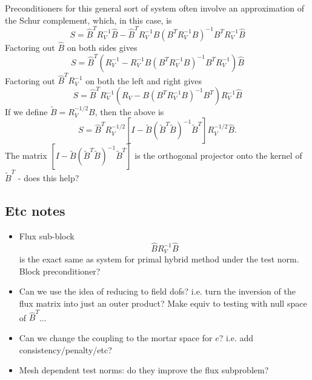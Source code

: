 \documentclass{article}
\newcommand{\LRp}[1]{\left( #1 \right)}
\newcommand{\LRs}[1]{\left[ #1 \right]}
\begin{document}
Preconditioners for this general sort of system often involve an approximation of the Schur complement, which, in this case, is
\[
S = \hat{B}^TR_V^{-1}\hat{B} - \hat{B}^TR_V^{-1}{B}\LRp{B^TR_V^{-1}B}^{-1} B^TR_V^{-1}\hat{B}
\]
Factoring out $\hat{B}$ on both sides gives
\[
S = \hat{B}^T\LRp{R_V^{-1} - R_V^{-1}{B}\LRp{B^TR_V^{-1}B}^{-1} B^TR_V^{-1}}\hat{B}
\]
Factoring out $\hat{B}^TR_V^{-1}$ on both the left and right gives
\[
S = \hat{B}^TR_V^{-1}\LRp{R_V-B\LRp{B^TR_V^{-1}B}^{-1}B^T}R_V^{-1}\hat{B}
\]
If we define $\tilde{B} = R_V^{-1/2}{B}$, then the above is
\[
S = \hat{B}^TR_V^{-1/2}\LRs{I - \tilde{B}(\tilde{B}^T\tilde{B})^{-1}\tilde{B}^T}R_V^{-1/2}\hat{B}.
\]
The matrix $\LRs{I - \tilde{B}(\tilde{B}^T\tilde{B})^{-1}\tilde{B}^T}$ is the orthogonal projector onto the kernel of $\tilde{B}^T$ - does this help? 

\subsection{Etc notes}
\begin{itemize}
\item Flux sub-block
\[
\hat{B}R_V^{-1}\hat{B}
\]
is the exact same as system for primal hybrid method under the test norm.  Block preconditioner?
\item Can we use the idea of reducing to field dofs?  i.e. turn the inversion of the flux matrix into just an outer product?  Make equiv to testing with null space of $\hat{B}^T$...
\item Can we change the coupling to the mortar space for $e$?  i.e. add consistency/penalty/etc?
\item Mesh dependent test norms: do they improve the flux subproblem?  
\end{itemize}
\end{document}
